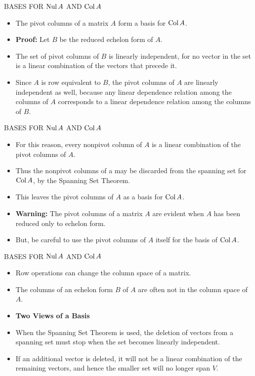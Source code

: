 \begin{frame}[shrink=14]{BASES FOR $\operatorname{Nul} A$ AND $\operatorname{Col} A$}
\begin{itemize}
\item {} The pivot columns of a matrix $A$ form a basis for $\operatorname{Col} A$.
\item \textbf{Proof:} Let $B$ be the reduced echelon form of $A$.
\item The set of pivot columns of $B$ is linearly independent, for no vector in the set is a linear combination of the vectors that precede it.
\item Since $A$ is row equivalent to $B$, the pivot columns of $A$ are linearly independent as well, because any linear dependence relation among the columns of $A$ corresponds to a linear dependence relation among the columns of $B$.
\end{itemize}
\end{frame}

\begin{frame}[shrink=13]{BASES FOR $\operatorname{Nul} A$ AND $\operatorname{Col} A$}
\begin{itemize}
\item For this reason, every nonpivot column of $A$ is a linear combination of the pivot columns of $A$.
\item Thus the nonpivot columns of a may be discarded from the spanning set for $\operatorname{Col} A$, by the Spanning Set Theorem.
\item This leaves the pivot columns of $A$ as a basis for $\operatorname{Col} A$.
\item \textbf{Warning:} The pivot columns of a matrix $A$ are evident when $A$ has been reduced only to echelon form.
\item But, be careful to use the pivot columns of $A$ itself for the basis of $\operatorname{Col} A$.
\end{itemize}
\end{frame}

\begin{frame}[shrink=12]{BASES FOR $\operatorname{Nul} A$ AND $\operatorname{Col} A$}
\begin{itemize}
\item Row operations can change the column space of a matrix.
\item The columns of an echelon form $B$ of $A$ are often not in the column space of $A$.
\item \textbf{Two Views of a Basis}
\item When the Spanning Set Theorem is used, the deletion of vectors from a spanning set must stop when the set becomes linearly independent.
\item If an additional vector is deleted, it will not be a linear combination of the remaining vectors, and hence the smaller set will no longer span $V$.
\end{itemize}
\end{frame}


